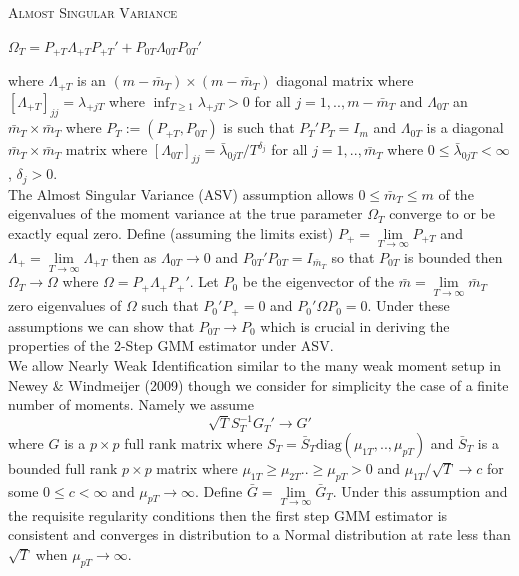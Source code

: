 \documentclass[11pt, fleqn]{article}
\begin{document}
\begin{center}
\textsc{Almost Singular Variance}
\end{center}
\begin{center}
$ \Omega_T=P_{+T}\Lambda_{+T}P_{+T}'+P_{0T}\Lambda_{0T}P_{0T}'$\end{center}
where $\Lambda_{+T}$ is an $(m-\bar{m}_T)\times(m-\bar{m}_T)$ diagonal matrix where $\left[\Lambda_{+T}\right]_{jj}=\lambda_{+jT}$ where $\inf_{T\geq 1} \lambda_{+jT}>0$ for all $j=1,..,m-\bar{m}_T$  and $ \Lambda_{0T}$ an $\bar{m}_T\times \bar{m}_T$  where   $P_T:=(P_{+T},P_{0T})$ is such that $P_T'P_T=I_m$ and $\Lambda_{0T}$ is a diagonal  $\bar{m}_T \times \bar{m}_T$ matrix where $\left[\Lambda_{0T}\right]_{jj}=\bar{\lambda}_{0jT}/T^{\delta_j}$  for all $j=1,..,\bar{m}_T$ where $0\leq \bar{\lambda}_{0jT} < \infty $, $\delta_j>0$.\\

The Almost Singular Variance (ASV)  assumption allows $0 \leq \bar{m}_T\leq m$ of the eigenvalues of the moment variance at the true parameter $\Omega_T$ converge to or be exactly equal zero. Define (assuming the limits exist) $P_+=\underset{T\rightarrow \infty}{\lim}P_{+T}$ and $\Lambda_+=\underset{T\rightarrow \infty}{\lim}\Lambda_{+T}$
then as $\Lambda_{0T}\rightarrow 0$ and $P_{0T}'P_{0T}=I_{\bar{m}_T}$ so that $P_{0T}$ is bounded then $\Omega_T\rightarrow \Omega$ where $\Omega=P_+\Lambda_+ P_+'$. Let $P_0$ be the eigenvector of the $\bar{m}=\underset{T\rightarrow \infty}{\lim} \bar{m}_T$ zero eigenvalues of $\Omega$  such that $P_0'P_+=0$ and $P_0'\Omega P_0=0$. Under these assumptions we can show that $P_{0T}\rightarrow P_0$ which is crucial in deriving the properties of the 2-Step GMM estimator under ASV.\\

We allow Nearly Weak Identification similar to the many weak moment  setup in Newey \& Windmeijer (2009) though we consider for simplicity the case of a finite number of moments. Namely we assume
\begin{equation} \sqrt{T}S_T^{-1}G_T'\rightarrow G' \end{equation}  where $G$ is a $p\times p$ full rank matrix   where $S_T= \bar{S}_T\textrm{diag}(\mu_{1T},..,\mu_{pT})$ and $\bar{S}_T$ is a bounded full rank  $p\times p$ matrix where $\mu_{1T}\geq\mu_{2T}..\geq \mu_{pT}>0$ and $\mu_{1T}/\sqrt{T}\rightarrow c$ for some $0\leq c< \infty$ and $\mu_{pT}\rightarrow \infty$. Define $\bar{G}=\underset{T\rightarrow \infty}{\lim} \bar{G}_T$. Under this assumption and the requisite regularity conditions then the first step GMM estimator is consistent and converges in distribution to a Normal distribution at  rate less than $\sqrt{T}$ when $\mu_{pT}\rightarrow \infty$.\\
\end{document}
